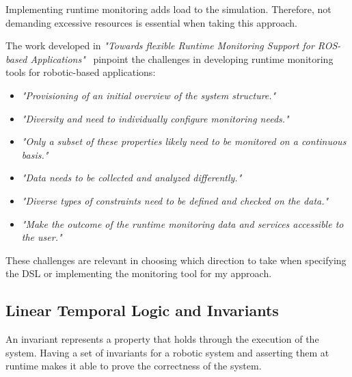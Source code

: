 Implementing runtime monitoring adds load to the simulation. Therefore, not demanding excessive resources is essential when taking this approach.

The work developed in \textit{"Towards flexible Runtime Monitoring Support for ROS-based Applications"}~\cite{stadler2022towards} pinpoint the challenges in developing runtime monitoring tools for robotic-based applications:

\begin{itemize}
    \item \textit{"Provisioning of an initial overview of the system structure."}
    \item \textit{"Diversity and need to individually configure monitoring needs."}
    \item \textit{"Only a subset of these properties likely need to be monitored on a continuous basis."}
    \item \textit{"Data needs to be collected and analyzed differently."}
    \item \textit{"Diverse types of constraints need to be defined and checked on the data."}
    \item \textit{"Make the outcome of the runtime monitoring data and services accessible to the user."}
\end{itemize}

These challenges are relevant in choosing which direction to take when specifying the DSL or implementing the monitoring tool for my approach.



\subsection{Linear Temporal Logic and Invariants}
\label{ssec:ltlinvariants}

An invariant represents a property that holds through the execution of the system. Having a set of invariants for a robotic system and asserting them at runtime makes it able to prove the correctness of the system.

